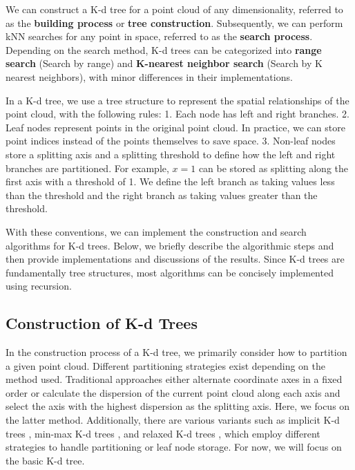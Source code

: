 We can construct a K-d tree for a point cloud of any dimensionality, referred to as the \textbf{building process} or \textbf{tree construction}. Subsequently, we can perform kNN searches for any point in space, referred to as the \textbf{search process}. Depending on the search method, K-d trees can be categorized into \textbf{range search} (Search by range) and \textbf{K-nearest neighbor search} (Search by K nearest neighbors), with minor differences in their implementations.  

In a K-d tree, we use a tree structure to represent the spatial relationships of the point cloud, with the following rules:  
1. Each node has left and right branches.  
2. Leaf nodes represent points in the original point cloud. In practice, we can store point indices instead of the points themselves to save space.  
3. Non-leaf nodes store a splitting axis and a splitting threshold to define how the left and right branches are partitioned. For example, \(x = 1\) can be stored as splitting along the first axis with a threshold of 1. We define the left branch as taking values less than the threshold and the right branch as taking values greater than the threshold.  

With these conventions, we can implement the construction and search algorithms for K-d trees. Below, we briefly describe the algorithmic steps and then provide implementations and discussions of the results. Since K-d trees are fundamentally tree structures, most algorithms can be concisely implemented using recursion.

\subsection{Construction of K-d Trees}
In the construction process of a K-d tree, we primarily consider how to partition a given point cloud. Different partitioning strategies exist depending on the method used. Traditional approaches either alternate coordinate axes in a fixed order \cite{DeBerg1997} or calculate the dispersion of the current point cloud along each axis and select the axis with the highest dispersion as the splitting axis. Here, we focus on the latter method. Additionally, there are various variants such as implicit K-d trees \cite{Gros2007}, min-max K-d trees \cite{Duvenhage2009}, and relaxed K-d trees \cite{Duch1998}, which employ different strategies to handle partitioning or leaf node storage. For now, we will focus on the basic K-d tree.

